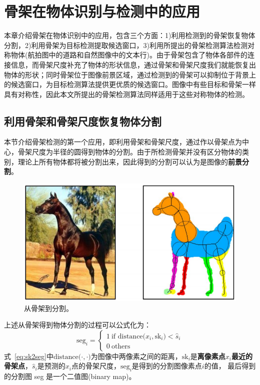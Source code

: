 \documentclass[UTF8]{ctexart}
\numberwithin{equation}{section} %
\numberwithin{table}{section} %
\begin{document}
\pagebreak
\section{骨架在物体识别与检测中的应用}%
本章介绍骨架在物体识别中的应用，包含三个方面：1)利用检测到的骨架恢复物体分割，2)利用骨架为目标检测提取候选窗口，3)利用所提出的骨架检测算法检测对称物体(航拍图中的道路和自然图像中的文本行)。由于骨架包含了物体各部件的连接信息，而骨架尺度补充了物体的形状信息，通过骨架和骨架尺度我们就能恢复出
物体的形状；同时骨架位于图像前景区域，通过检测到的骨架可以抑制位于背景上的候选窗口，为目标检测算法提供更优质的候选窗口。图像中有些目标和骨架一样具有对称性，因此本文所提出的骨架检测算法同样适用于这些对称物体的检测。

\subsection{利用骨架和骨架尺度恢复物体分割}\label{sec:seg_recover}
本节介绍骨架检测的第一个应用，即利用骨架和骨架尺度，通过作以骨架点为中心，骨架尺度为半径的圆得到物体的分割。由于所检测骨架并没有区分物体的类别，理论上所有物体都将被分割出来，因此得到的分割可以认为是图像的\textbf{前景分割}。
\begin{figure}[!htb]
\centering
\includegraphics[scale=0.3]{figures/sk2seg.png}
\caption{从骨架到分割。}
\label{fig:sk2seg}
\end{figure}
上述从骨架得到物体分割的过程可以公式化为：
\begin{equation}
\text{seg}_i =
\begin{cases}
 1 \ \text{if distance(}x_i,\text{sk}_i\text{)}<\hat{s}_i \\
0 \ \text{others}
\end{cases}
\label{eq:sk2seg}
\end{equation}
式~\ref{eq:sk2seg}中$\text{distance(}\cdot,\cdot \text{)}$为图像中两像素之间的距离，$\text{sk}_i$是\textbf{离像素点$x_i$最近的骨架点}，$\hat{s}_i$是预测的$x_i$点的骨架尺度，$\text{seg}_i$是得到的分割图像素点$i$的值，
最后得到的分割图 seg 是一个二值图(binary map)。
\end{document}
